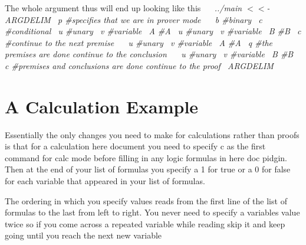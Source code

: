 The whole argument thus will end up looking like this~\newline
 ~\newline
 {\itshape  {\ttfamily  ../main $<$$<$-\/ A\+R\+G\+D\+E\+L\+IM~\newline
 p \#specifies that we are in prover mode~\newline
 ~\newline
 b \#binary~\newline
 c \#conditional~\newline
 u \#unary~\newline
 v \#variable~\newline
 A \#A~\newline
 u \#unary~\newline
 v \#variable~\newline
 B \#B~\newline
 c \#continue to the next premise~\newline
 ~\newline
 u \#unary~\newline
 v \#variable~\newline
 A \#A~\newline
 q \#the premises are done continue to the conclusion~\newline
 ~\newline
 u \#unary~\newline
 v \#variable~\newline
 B \#B~\newline
 c \#premises and conclusions are done continue to the proof~\newline
 A\+R\+G\+D\+E\+L\+IM~\newline
 } }

\section*{A Calculation Example}

Essentially the only changes you need to make for calculations rather than proofs is that for a calculation here document you need to specify c as the first command for calc mode before filling in any logic formulas in here doc pidgin. Then at the end of your list of formulas you specify a 1 for true or a 0 for false for each variable that appeared in your list of formulas.

The ordering in which you specify values reads from the first line of the list of formulas to the last from left to right. You never need to specify a variables value twice so if you come across a repeated variable while reading skip it and keep going until you reach the next new variable

